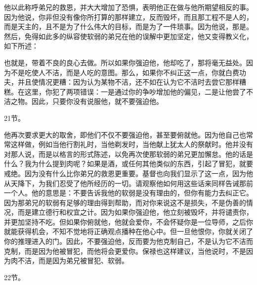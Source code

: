 他以此称呼弟兄的救恩，并大大增加了恐惧，表明他正在做与他所期望相反的事。因为他说，你非但没有像你所打算的那样建立，反而毁坏，而且那工程不是人的，而是天主的，且不是为了什么伟大的目标，而是为了一件琐事。因为他说，那是。然后，免得如此多的纵容使软弱的弟兄在他的误解中更加坚定，他又变得教义化，如下所述：\par

\par

也就是，带着不良的良心去做。所以如果你强迫他，他却吃了，那将毫无益处。因为不是吃使人不洁，而是人吃的意图。那么，如果你不纠正这一点，你就白费功夫，并且使情况更糟：因为认为某物不洁，还不如在认为它不洁时去尝它那样糟糕。在这里，你犯了两项错误：一是通过你的争吵增加他的偏见，二是让他尝了不洁之物。因此，只要你没有说服他，就不要强迫他。\par

21节。\par

他再次要求更大的取舍，即他们不仅不要强迫他，甚至要俯就他。因为他自己也常常这样做，例如当他行割礼时，当他剃发时，当他献上犹太人的祭献时。他并没有对那人说，而是以格言的形式陈述，以免再次使那软弱的弟兄更加懈怠。他的话是什么？我为什么提到肉呢？如果是酒，或任何其他类似的东西，引起了冒犯，就要戒绝。因为没有什么比你弟兄的救恩更重要。基督也向我们显示了这一点，因为他从天降下，为我们忍受了他所经历的一切。请观察他如何用这些话来同样告诫那前一个人。他的意思是：不要告诉我他的软弱是没有理由的，但你有能力去纠正它。因为那弟兄的软弱有足够的理由得到帮助，而对你来说这不是损失，不是伪善的情况，而是建立德行和权宜之计。因为如果你强迫他，他立刻被毁坏，并将谴责你，并更加坚持不吃。但如果你俯就他，他就会爱你，不会怀疑你是一位导师，之后你就能获得机会，不知不觉地将正确观点播种在他心中。但一旦他恨你，你就关闭了你的推理进入的门。因此，不要强迫他，反而要为他克制自己，不是认为它不洁而克制，而是因为他被冒犯，而他将会更爱你。保禄也这样建议，当他说时，不是因为肉不洁，而是因为弟兄被冒犯、软弱。\par

22节。\par

